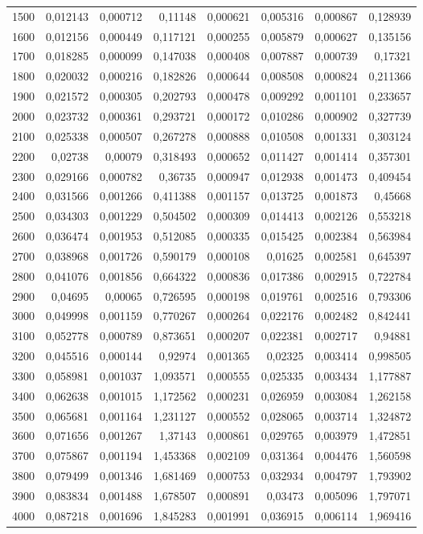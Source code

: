 \begin{tabular}{r r r r r r r r}
1500 & 0,012143 & 0,000712 & 0,11148 & 0,000621 & 0,005316 & 0,000867 & 0,128939 \\
1600 & 0,012156 & 0,000449 & 0,117121 & 0,000255 & 0,005879 & 0,000627 & 0,135156 \\
1700 & 0,018285 & 0,000099 & 0,147038 & 0,000408 & 0,007887 & 0,000739 & 0,17321 \\
1800 & 0,020032 & 0,000216 & 0,182826 & 0,000644 & 0,008508 & 0,000824 & 0,211366 \\
1900 & 0,021572 & 0,000305 & 0,202793 & 0,000478 & 0,009292 & 0,001101 & 0,233657 \\
2000 & 0,023732 & 0,000361 & 0,293721 & 0,000172 & 0,010286 & 0,000902 & 0,327739 \\
2100 & 0,025338 & 0,000507 & 0,267278 & 0,000888 & 0,010508 & 0,001331 & 0,303124 \\
2200 & 0,02738 & 0,00079 & 0,318493 & 0,000652 & 0,011427 & 0,001414 & 0,357301 \\
2300 & 0,029166 & 0,000782 & 0,36735 & 0,000947 & 0,012938 & 0,001473 & 0,409454 \\
2400 & 0,031566 & 0,001266 & 0,411388 & 0,001157 & 0,013725 & 0,001873 & 0,45668 \\
2500 & 0,034303 & 0,001229 & 0,504502 & 0,000309 & 0,014413 & 0,002126 & 0,553218 \\
2600 & 0,036474 & 0,001953 & 0,512085 & 0,000335 & 0,015425 & 0,002384 & 0,563984 \\
2700 & 0,038968 & 0,001726 & 0,590179 & 0,000108 & 0,01625 & 0,002581 & 0,645397 \\
2800 & 0,041076 & 0,001856 & 0,664322 & 0,000836 & 0,017386 & 0,002915 & 0,722784 \\
2900 & 0,04695 & 0,00065 & 0,726595 & 0,000198 & 0,019761 & 0,002516 & 0,793306 \\
3000 & 0,049998 & 0,001159 & 0,770267 & 0,000264 & 0,022176 & 0,002482 & 0,842441 \\
3100 & 0,052778 & 0,000789 & 0,873651 & 0,000207 & 0,022381 & 0,002717 & 0,94881 \\
3200 & 0,045516 & 0,000144 & 0,92974 & 0,001365 & 0,02325 & 0,003414 & 0,998505 \\
3300 & 0,058981 & 0,001037 & 1,093571 & 0,000555 & 0,025335 & 0,003434 & 1,177887 \\
3400 & 0,062638 & 0,001015 & 1,172562 & 0,000231 & 0,026959 & 0,003084 & 1,262158 \\
3500 & 0,065681 & 0,001164 & 1,231127 & 0,000552 & 0,028065 & 0,003714 & 1,324872 \\
3600 & 0,071656 & 0,001267 & 1,37143 & 0,000861 & 0,029765 & 0,003979 & 1,472851 \\
3700 & 0,075867 & 0,001194 & 1,453368 & 0,002109 & 0,031364 & 0,004476 & 1,560598 \\
3800 & 0,079499 & 0,001346 & 1,681469 & 0,000753 & 0,032934 & 0,004797 & 1,793902 \\
3900 & 0,083834 & 0,001488 & 1,678507 & 0,000891 & 0,03473 & 0,005096 & 1,797071 \\
4000 & 0,087218 & 0,001696 & 1,845283 & 0,001991 & 0,036915 & 0,006114 & 1,969416 \\
\end{tabular}